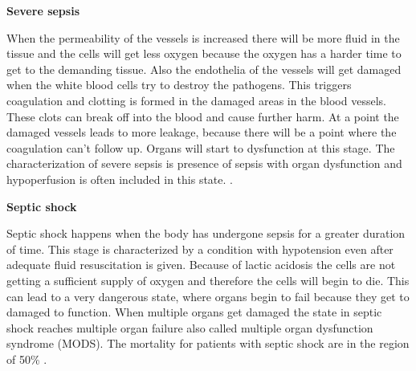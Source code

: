\textbf{Severe sepsis}

When the permeability of the vessels is increased there will be more fluid in the tissue and the cells will get less oxygen because the oxygen has a harder time to get to the demanding tissue. Also the endothelia of the vessels will get damaged when the white blood cells try to destroy the pathogens. This triggers coagulation and clotting is formed in the damaged areas in the blood vessels. These clots can break off into the blood and cause further harm. At a point the damaged vessels leads to more leakage, because there will be a point where the coagulation can’t follow up. Organs will start to dysfunction at this stage. The characterization of severe sepsis is presence of sepsis with organ dysfunction and hypoperfusion is often included in this state. \cite{baudouin200,kanta2014}. 

\textbf{Septic shock}

Septic shock happens when the body has undergone sepsis for a greater duration of time. This stage is characterized by a condition with hypotension even after adequate fluid resuscitation is given. Because of lactic acidosis the cells are not getting a sufficient supply of oxygen and therefore the cells will begin to die. This can lead to a very dangerous state, where organs begin to fail because they get to damaged to function. When multiple organs get damaged the state in septic shock reaches multiple organ failure also called multiple organ dysfunction syndrome (MODS)\cite{baudouin200,kanta2014}. The mortality for patients with septic shock are in the region of 50\% \cite{baudouin200}. 

